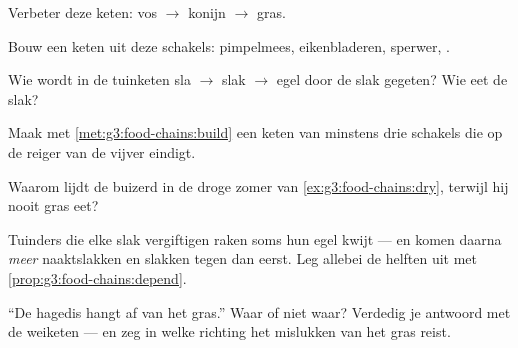 \begin{exercise}[$\star$]\label{exo:g3:food-chains:4}
Verbeter deze keten: vos $\rightarrow$ konijn $\rightarrow$ gras.
\end{exercise}

\begin{exercise}[$\star$]\label{exo:g3:food-chains:5}
Bouw een keten uit deze schakels: pimpelmees, eikenbladeren, sperwer,
.
\end{exercise}

\begin{exercise}[$\star$]\label{exo:g3:food-chains:6}
Wie wordt in de tuinketen sla $\rightarrow$ slak $\rightarrow$ egel
door de slak gegeten? Wie eet de slak?
\end{exercise}

\begin{exercise}[$\star$]\label{exo:g3:food-chains:7}
Maak met \cref{met:g3:food-chains:build} een keten van minstens drie
schakels die op de reiger van de vijver eindigt.
\end{exercise}

\begin{exercise}[$\star$]\label{exo:g3:food-chains:8}
Waarom lijdt de buizerd in de droge zomer van
\cref{ex:g3:food-chains:dry}, terwijl hij nooit gras eet?
\end{exercise}

\begin{exercise}[$\star\star$]\label{exo:g3:food-chains:9}
Tuinders die elke slak vergiftigen raken soms hun egel kwijt --- en
komen daarna \emph{meer} naaktslakken en slakken tegen dan eerst. Leg
allebei de helften uit met \cref{prop:g3:food-chains:depend}.
\end{exercise}

\begin{exercise}[$\star\star$]\label{exo:g3:food-chains:10}
``De hagedis hangt af van het gras.'' Waar of niet waar? Verdedig je
antwoord met de weiketen --- en zeg in welke richting het mislukken van
het gras reist.
\end{exercise}
